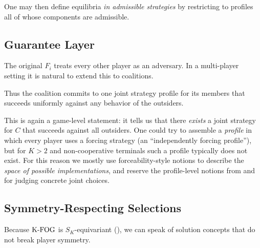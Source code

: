 One may then define equilibria \emph{in admissible strategies} by restricting
 to profiles all of whose components are admissible.

\subsection{Guarantee Layer}
\label{subsec:guarantee}

The original $F_i$ treats every other player as an adversary. In a multi-player
setting it is natural to extend this to coalitions.

Thus the coalition commits to one joint strategy profile for its members that
succeeds uniformly against any behavior of the outsiders.

This is again a game-level statement: it tells us that there \emph{exists} a
joint strategy for $C$ that succeeds against all outsiders. One could try to
assemble a \emph{profile} in which every player uses a forcing strategy (an
``independently forcing profile''), but for $K>2$ and non-cooperative terminals
such a profile typically does not exist. For this reason we mostly use
forceability-style notions to describe the \emph{space of possible
implementations}, and reserve the profile-level notions from
 and  for judging
concrete joint choices.

\subsection{Symmetry-Respecting Selections}
\label{subsec:symmetry-solutions}

Because $\mathrm{K\text{-}FOG}$ is $S_K$-equivariant (), we can speak
of solution concepts that do not break player symmetry.


